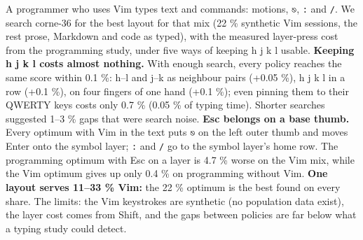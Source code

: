 \documentclass{gecko-paper}
\begin{document}
\makepapertitle
\begin{paperabstract}
A programmer who uses Vim types text and commands: motions, \texttt{⎋}, \texttt{:} and \texttt{/}. We search corne-36 for the best layout for that mix (22 \% synthetic Vim sessions, the rest prose, Markdown and code as typed), with the measured layer-press cost from the programming study, under five ways of keeping h j k l usable. \textbf{Keeping h j k l costs almost nothing.} With enough search,
every policy reaches the same score within 0.1 \%: h–l and j–k as neighbour pairs (+0.05 \%), h j k l in a row (+0.1 \%), on four fingers of one hand (+0.1 \%); even pinning them to their QWERTY keys costs only 0.7 \% (0.05 \% of typing time). Shorter searches suggested 1–3 \% gaps that were search noise. \textbf{Esc belongs on a base thumb.} Every optimum with Vim in the text puts \texttt{⎋}
on the left outer thumb and moves Enter onto the symbol layer; \texttt{:} and \texttt{/} go to the symbol layer's home row. The programming optimum with Esc on a layer is 4.7 \% worse on the Vim mix, while the Vim optimum gives up only 0.4 \% on programming without Vim. \textbf{One layout serves 11–33 \% Vim:} the 22 \% optimum is the best found on every share. The limits: the Vim keystrokes are
synthetic (no population data exist), the layer cost comes from Shift, and the gaps between policies are far below what a typing study could detect.

\end{paperabstract}
\raggedright
\end{document}
